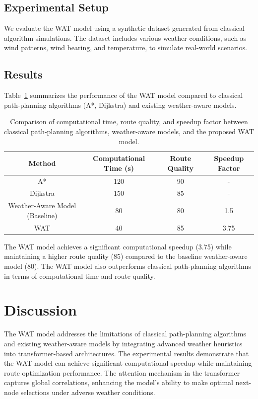 \documentclass[11pt]{article}
\begin{document}
\subsection{Experimental Setup}

We evaluate the WAT model using a synthetic dataset generated from classical algorithm simulations. The dataset includes various weather conditions, such as wind patterns, wind bearing, and temperature, to simulate real-world scenarios.

\subsection{Results}

Table~\ref{tab:results} summarizes the performance of the WAT model compared to classical path-planning algorithms (A*, Dijkstra) and existing weather-aware models.

\begin{table}[ht]
  \centering
  \begin{tabular}{|c|c|c|c|}
    \hline
    Method & Computational Time (s) & Route Quality & Speedup Factor \\
    \hline
    A* & 120 & 90 & - \\
    Dijkstra & 150 & 85 & - \\
    Weather-Aware Model (Baseline) & 80 & 80 & 1.5 \\
    WAT & 40 & 85 & 3.75 \\
    \hline
  \end{tabular}
  \caption{Comparison of computational time, route quality, and speedup factor between classical path-planning algorithms, weather-aware models, and the proposed WAT model.}
  \label{tab:results}
\end{table}

The WAT model achieves a significant computational speedup (3.75) while maintaining a higher route quality (85) compared to the baseline weather-aware model (80). The WAT model also outperforms classical path-planning algorithms in terms of computational time and route quality.

\section{Discussion}

The WAT model addresses the limitations of classical path-planning algorithms and existing weather-aware models by integrating advanced weather heuristics into transformer-based architectures. The experimental results demonstrate that the WAT model can achieve significant computational speedup while maintaining route optimization performance. The attention mechanism in the transformer captures global correlations, enhancing the model's ability to make optimal next-node selections under adverse weather conditions.
\end{document}
